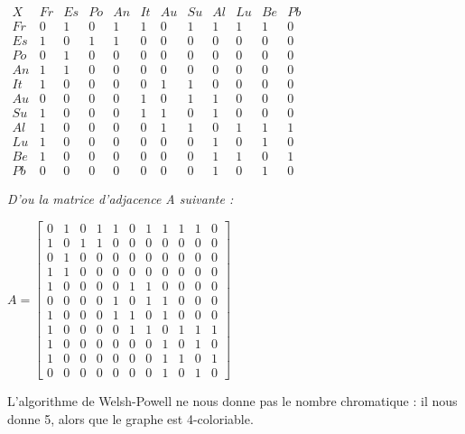 \documentclass{article}
\begin{document}
	\begin{center}
	$
	\begin{matrix}
		X & Fr & Es & Po & An & It & Au & Su & Al & Lu & Be & Pb\\
		Fr&0&1&0&1&1&0&1&1&1&1&0\\
		Es&1&0&1&1&0&0&0&0&0&0&0\\
		Po&0&1&0&0&0&0&0&0&0&0&0\\
		An&1&1&0&0&0&0&0&0&0&0&0\\
		It&1&0&0&0&0&1&1&0&0&0&0\\
		Au&0&0&0&0&1&0&1&1&0&0&0\\
		Su&1&0&0&0&1&1&0&1&0&0&0\\
		Al&1&0&0&0&0&1&1&0&1&1&1\\
		Lu&1&0&0&0&0&0&0&1&0&1&0\\
		Be&1&0&0&0&0&0&0&1&1&0&1\\
		Pb&0&0&0&0&0&0&0&1&0&1&0
	\end{matrix}
	$
\end{center}
	\textit{D'ou la matrice d'adjacence A suivante :}
\begin{center}
	$
	A = 
	\left[\begin{matrix}
		0&1&0&1&1&0&1&1&1&1&0\\
		1&0&1&1&0&0&0&0&0&0&0\\
		0&1&0&0&0&0&0&0&0&0&0\\
		1&1&0&0&0&0&0&0&0&0&0\\
		1&0&0&0&0&1&1&0&0&0&0\\
		0&0&0&0&1&0&1&1&0&0&0\\
		1&0&0&0&1&1&0&1&0&0&0\\
		1&0&0&0&0&1&1&0&1&1&1\\
		1&0&0&0&0&0&0&1&0&1&0\\
		1&0&0&0&0&0&0&1&1&0&1\\
		0&0&0&0&0&0&0&1&0&1&0
	\end{matrix}\right]
	$
	\end{center}
	\textsf{L'algorithme de Welsh-Powell ne nous donne pas le nombre chromatique : il nous donne 5, alors que le graphe est 4-coloriable.}\\\\
\end{document}
